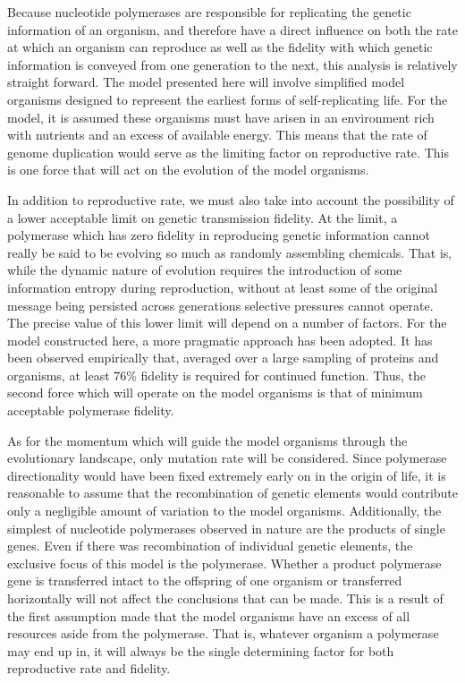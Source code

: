 Because nucleotide polymerases are responsible for replicating the genetic information of an organism, and therefore have a direct influence on both the rate at which an organism can reproduce as well as the fidelity with which genetic information is conveyed from one generation to the next, this analysis is relatively straight forward. The model presented here will involve simplified model organisms designed to represent the earliest forms of self-replicating life. For the model, it is assumed these organisms must have arisen in an environment rich with nutrients and an excess of available energy. This means that the rate of genome duplication would serve as the limiting factor on reproductive rate. This is one force that will act on the evolution of the model organisms.

In addition to reproductive rate, we must also take into account the possibility of a lower acceptable limit on genetic transmission fidelity. At the limit, a polymerase which has zero fidelity in reproducing genetic information cannot really be said to be evolving so much as randomly assembling chemicals. That is, while the dynamic nature of evolution requires the introduction of some information entropy during reproduction, without at least some of the original message being persisted across generations selective pressures cannot operate. The precise value of this lower limit will depend on a number of factors. For the model constructed here, a more pragmatic approach has been adopted. It has been observed empirically that, averaged over a large sampling of proteins and organisms, at least 76\% fidelity is required for continued function. Thus, the second force which will operate on the model organisms is that of minimum acceptable polymerase fidelity.

As for the momentum which will guide the model organisms through the evolutionary landscape, only mutation rate will be considered. Since polymerase directionality would have been fixed extremely early on in the origin of life, it is reasonable to assume that the recombination of genetic elements would contribute only a negligible amount of variation to the model organisms. Additionally, the simplest of nucleotide polymerases observed in nature are the products of single genes. Even if there was recombination of individual genetic elements, the exclusive focus of this model is the polymerase. Whether a product polymerase gene is transferred intact to the offspring of one organism or transferred horizontally will not affect the conclusions that can be made. This is a result of the first assumption made that the model organisms have an excess of all resources aside from the polymerase. That is, whatever organism a polymerase may end up in, it will always be the single determining factor for both reproductive rate and fidelity.

